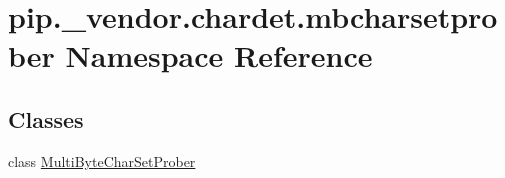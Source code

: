 \hypertarget{namespacepip_1_1__vendor_1_1chardet_1_1mbcharsetprober}{}\section{pip.\+\_\+vendor.\+chardet.\+mbcharsetprober Namespace Reference}
\label{namespacepip_1_1__vendor_1_1chardet_1_1mbcharsetprober}
\subsection*{Classes}
\begin{DoxyCompactItemize}
\item 
class \hyperlink{classpip_1_1__vendor_1_1chardet_1_1mbcharsetprober_1_1MultiByteCharSetProber}{Multi\+Byte\+Char\+Set\+Prober}
\end{DoxyCompactItemize}
